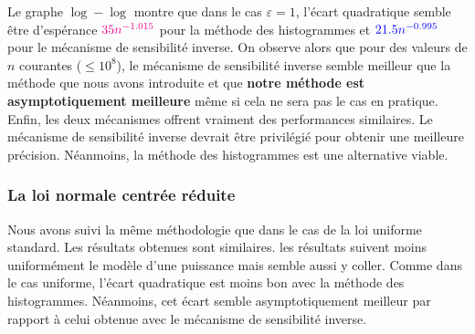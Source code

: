 Le graphe \(\log-\log\) montre que dans le cas \(\varepsilon = 1\), l'écart quadratique semble être d’espérance \(\color{magenta} 35n^{-1.015}\) pour la méthode des histogrammes et \(\color{blue} 21.5n^{-0.995}\) pour le mécanisme de sensibilité inverse. On observe alors que pour des valeurs de \(n\) courantes (\(\leq 10^8\)), le mécanisme de sensibilité inverse semble meilleur que la méthode que nous avons introduite et que \textbf{notre méthode est asymptotiquement meilleure} même si cela ne sera pas le cas en pratique.\\

Enfin, les deux mécanismes offrent vraiment des performances similaires. Le mécanisme de sensibilité inverse devrait être privilégié pour obtenir une meilleure précision. Néanmoins, la méthode des histogrammes est une alternative viable.

\subsubsection{La loi normale centrée réduite}


Nous avons suivi la même méthodologie que dans le cas de la loi uniforme standard. Les résultats obtenues sont similaires. les résultats suivent moins uniformément le modèle d'une puissance mais semble aussi y coller. Comme dans le cas uniforme, l'écart quadratique est moins bon avec la méthode des histogrammes. Néanmoins, cet écart semble asymptotiquement meilleur par rapport à celui obtenue avec le mécanisme de sensibilité inverse. 

